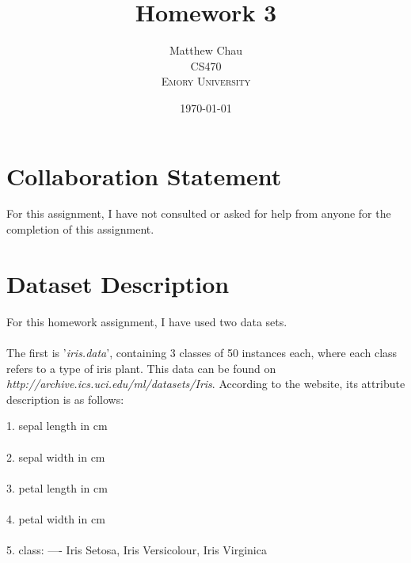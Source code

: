 \documentclass[12pt]{article}
\title{Homework 3} %
\author{Matthew Chau\\ %
CS470\\ %
\textsc{Emory University}
}
\date{\today} %
\begin{document}
\setlength{\droptitle}{-5em}
\maketitle


\section*{Collaboration Statement}
For this assignment, I have not consulted or asked for help from anyone for the completion of this assignment.


\section*{Dataset Description}

For this homework assignment, I have used two data sets. \\\\
The first is '\textit{iris.data}', containing 3 classes of 50 instances each, where each class refers to a type of iris plant. This data can be found on \textit{http://archive.ics.uci.edu/ml/datasets/Iris}. According to the website, its attribute description is as follows:
\begin{flushleft}
1. sepal length in cm\\\\
2. sepal width in cm\\\\
3. petal length in cm\\\\
4. petal width in cm\\\\
5. class:
---- Iris Setosa, Iris Versicolour, Iris Virginica\\\\
\end{flushleft}
\end{document}
